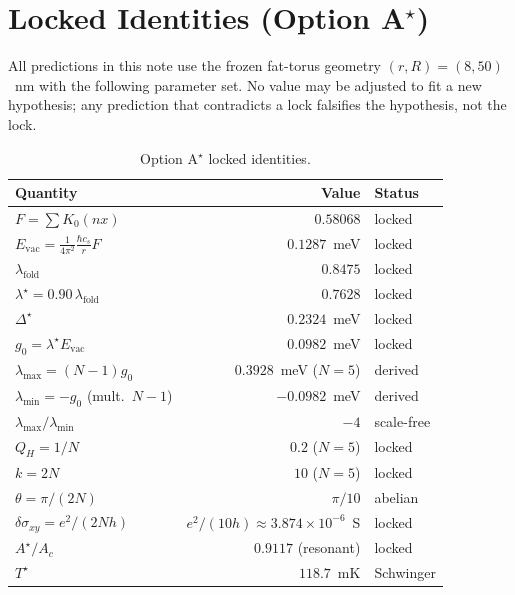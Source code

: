 \documentclass[11pt,letterpaper]{article}
\newcommand{\gzero}{g_0}
\newcommand{\Evac}{E_{\mathrm{vac}}}
\newcommand{\Flock}{F}
\newcommand{\lastar}{\lambda^{\!\star}}
\newcommand{\lfold}{\lambda_{\mathrm{fold}}}
\newcommand{\AresAc}{A^{\!\star}\!/A_c}
\newcommand{\Qhopf}{Q_H}
\newcommand{\Tstar}{T^{\!\star}}
\newcommand{\Dstar}{\Delta^{\!\star}}
\begin{document}
\section{Locked Identities (Option A$^{\!\star}$)}\label{sec:locks}

All predictions in this note use the frozen fat-torus geometry $(r,R) = (8,50)$~nm with the following parameter set.  No value may be adjusted to fit a new hypothesis; any prediction that contradicts a lock falsifies the hypothesis, not the lock.

\begin{table}[H]
\centering
\caption{Option A$^{\!\star}$ locked identities.}\label{tab:locks}
\begin{tabular}{@{}lrl@{}}
\toprule
\textbf{Quantity} & \textbf{Value} & \textbf{Status} \\
\midrule
$\Flock = \sum K_0(nx)$               & $0.58068$           & locked \\
$\Evac = \frac{1}{4\pi^2}\frac{\hbar c_s}{r}\Flock$ & $0.1287$~meV  & locked \\
$\lfold$                                & $0.8475$            & locked \\
$\lastar = 0.90\,\lfold$               & $0.7628$            & locked \\
$\Dstar$                                & $0.2324$~meV        & locked \\
$\gzero = \lastar\Evac$                 & $0.0982$~meV        & locked \\
$\lambda_{\max} = (N{-}1)\gzero$        & $0.3928$~meV ($N{=}5$) & derived \\
$\lambda_{\min} = -\gzero$ (mult.\ $N{-}1$) & $-0.0982$~meV & derived \\
$\lambda_{\max}/\lambda_{\min}$          & $-4$                & scale-free \\
$\Qhopf = 1/N$                          & $0.2$ ($N{=}5$)     & locked \\
$k = 2N$                                & $10$ ($N{=}5$)      & locked \\
$\theta = \pi/(2N)$                      & $\pi/10$            & abelian \\
$\delta\sigma_{xy} = e^2/(2Nh)$         & $e^2/(10h) \approx 3.874 \times 10^{-6}$~S & locked \\
$\AresAc$                               & $0.9117$ (resonant) & locked \\
$\Tstar$                                & $118.7$~mK          & Schwinger \\
\bottomrule
\end{tabular}
\end{table}
\end{document}
